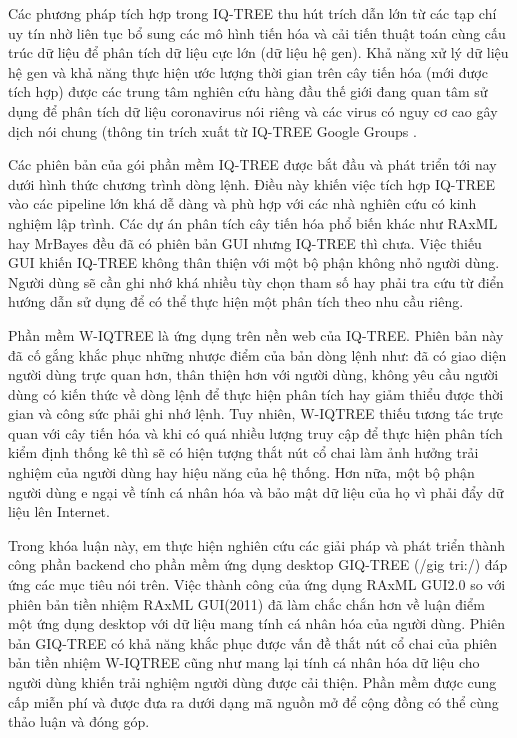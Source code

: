 \documentclass[12pt]{report}
\begin{document}
Các phương pháp tích hợp trong IQ-TREE thu hút trích dẫn lớn từ các tạp chí uy tín nhờ liên tục bổ sung các mô hình tiến hóa và cải tiến thuật toán cùng cấu trúc dữ liệu để phân tích dữ liệu cực lớn (dữ liệu hệ gen). Khả năng xử lý dữ liệu hệ gen và khả năng thực hiện ước lượng thời gian trên cây tiến hóa (mới được tích hợp) được các trung tâm nghiên cứu hàng đầu thế giới đang quan tâm sử dụng để phân tích dữ liệu coronavirus nói riêng và các virus có nguy cơ cao gây dịch nói chung (thông tin trích xuất từ IQ-TREE Google Groups \cite{cia-19}.

Các phiên bản của gói phần mềm IQ-TREE được bắt đầu và phát triển tới nay dưới hình thức chương trình dòng lệnh. Điều này khiến việc tích hợp IQ-TREE vào các pipeline lớn khá dễ dàng và phù hợp với các nhà nghiên cứu có kinh nghiệm lập trình. Các dự án phân tích cây tiến hóa phổ biến khác như RAxML hay MrBayes đều đã có phiên bản GUI nhưng IQ-TREE thì chưa. Việc thiếu GUI khiến IQ-TREE không thân thiện với một bộ phận không nhỏ người dùng. Người dùng sẽ cần ghi nhớ khá nhiều tùy chọn tham số hay phải tra cứu từ điển hướng dẫn sử dụng để có thể thực hiện một phân tích theo nhu cầu riêng. 

Phần mềm W-IQTREE là ứng dụng trên nền web của IQ-TREE. Phiên bản này đã cố gắng khắc phục những nhược điểm của bản dòng lệnh như: đã có giao diện người dùng trực quan hơn, thân thiện hơn với người dùng, không yêu cầu người dùng có kiến thức về dòng lệnh để thực hiện phân tích hay giảm thiểu được thời gian và công sức phải ghi nhớ lệnh. Tuy nhiên, W-IQTREE thiếu tương tác trực quan với cây tiến hóa và khi có quá nhiều lượng truy cập để thực hiện phân tích kiểm định thống kê thì sẽ có hiện tượng thắt nút cổ chai làm ảnh hưởng trải nghiệm của người dùng hay hiệu năng của hệ thống. Hơn nữa, một bộ phận người dùng e ngại về tính cá nhân hóa và bảo mật dữ liệu của họ vì phải đẩy dữ liệu lên Internet.

Trong khóa luận này, em thực hiện nghiên cứu các giải pháp và phát triển thành công phần backend cho phần mềm ứng dụng desktop GIQ-TREE (/gig tri:/) đáp ứng các mục tiêu nói trên. Việc thành công của ứng dụng RAxML GUI2.0 so với phiên bản tiền nhiệm RAxML GUI(2011) đã làm chắc chắn hơn về luận điểm một ứng dụng desktop với dữ liệu mang tính cá nhân hóa của người dùng. Phiên bản GIQ-TREE có khả năng khắc phục được vấn đề thắt nút cổ chai của phiên bản tiền nhiệm W-IQTREE cũng như mang lại tính cá nhân hóa dữ liệu cho người dùng khiến trải nghiệm người dùng được cải thiện. Phần mềm được cung cấp miễn phí và được đưa ra dưới dạng mã nguồn mở để cộng đồng có thể cùng thảo luận và đóng góp.
\end{document}
